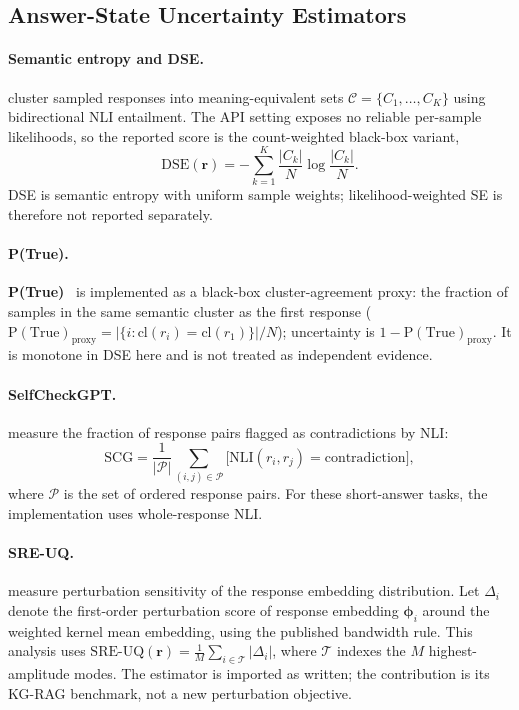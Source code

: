 \subsection{Answer-State Uncertainty Estimators}
\label{sec:gen_metrics}

\paragraph{Semantic entropy and DSE.}
\citet{kuhn2023semantic} cluster sampled responses into meaning-equivalent
sets $\mathcal{C}=\{C_1,\ldots,C_K\}$ using bidirectional NLI entailment.
The API setting exposes no reliable per-sample likelihoods, so the reported
score is the count-weighted black-box variant,
\begin{equation}
  \mathrm{DSE}(\bm{r})
  = -\sum_{k=1}^{K} \frac{|C_k|}{N}\log\frac{|C_k|}{N}.
\end{equation}
DSE is semantic entropy with uniform sample weights; likelihood-weighted SE is
therefore not reported separately.

\paragraph{P(True).}
\textbf{P(True)}~\citep{kadavath2022language} is implemented as a black-box
cluster-agreement proxy: the fraction of samples in the same semantic cluster
as the first response
($\mathrm{P(True)}_{\mathrm{proxy}} =
|\{i: \mathrm{cl}(r_i)=\mathrm{cl}(r_1)\}|/N$);
uncertainty is $1 - \mathrm{P(True)}_{\mathrm{proxy}}$.
It is monotone in DSE here and is not treated as independent evidence.

\paragraph{SelfCheckGPT.}
\citet{manakul2023selfcheckgpt} measure the fraction of response pairs flagged
as contradictions by NLI:
\begin{equation}
  \mathrm{SCG}
  = \frac{1}{|\mathcal{P}|}
    \sum_{(i,j)\in\mathcal{P}}
    \bigl[\mathrm{NLI}(r_i,r_j)=\text{contradiction}\bigr],
\end{equation}
where $\mathcal{P}$ is the set of ordered response pairs.
For these short-answer tasks, the implementation uses whole-response NLI.

\paragraph{SRE-UQ.}
\citet{vipulanandan2026sreuq} measure perturbation sensitivity of the response
embedding distribution.
Let $\Delta_i$ denote the first-order perturbation score of response embedding
$\bm{\phi}_i$ around the weighted kernel mean embedding, using the published
bandwidth rule.
This analysis uses
$\displaystyle\mathrm{SRE\text{-}UQ}(\bm{r})
  = \frac{1}{M}\sum_{i \in \mathcal{T}} |\Delta_i|$,
where $\mathcal{T}$ indexes the $M$ highest-amplitude modes.
The estimator is imported as written; the contribution is its KG-RAG
benchmark, not a new perturbation objective.


